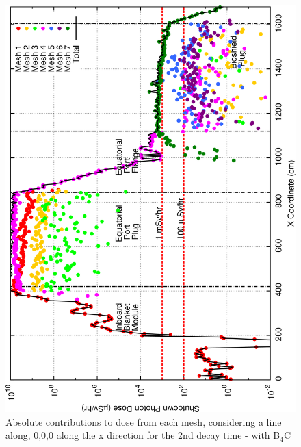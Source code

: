 \documentclass[12pt]{article}
\begin{document}
\begin{figure}[ht!]
\centering
\includegraphics[clip,scale=0.25]{../plots/crosstalk/b4c/ep/dc2.png}
\caption{Absolute contributions to dose from each mesh, considering a line along,
         0,0,0 along the x direction for the 2nd decay time - with B$_4$C}
\label{fig:b4c_ct_ep_dc2}
\end{figure}
\end{document}
